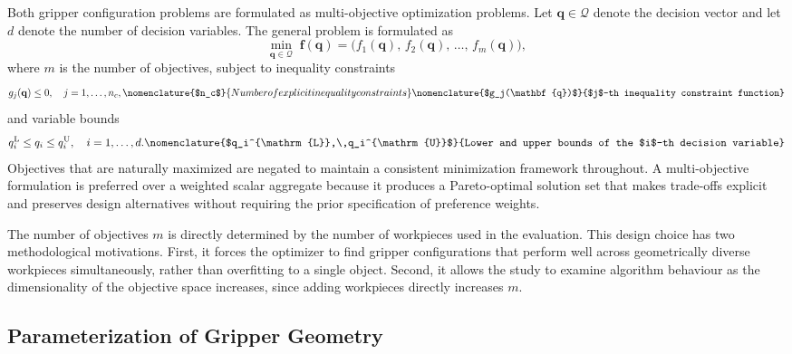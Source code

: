 Both gripper configuration problems are formulated as multi-objective optimization problems. Let $\mathbf{q} \in \mathcal{Q}$
  denote the decision vector and let $d$
denote the number of decision variables. The general problem is formulated as
\begin{equation}
    \min_{\mathbf{q} \in \mathcal{Q}}\;
    \mathbf{f}(\mathbf{q})
    = \bigl(f_1(\mathbf{q}),\, f_2(\mathbf{q}),\, \dots,\, f_m(\mathbf{q})\bigr),
\end{equation}
where $m$
is the number of objectives, subject to inequality constraints
\begin{equation}
    g_j(\mathbf{q}) \leq 0, \quad j = 1, \dots, n_c,
    \nomenclature{$n_c$}{Number of explicit inequality constraints}
    \nomenclature{$g_j(\mathbf{q})$}{$j$-th inequality constraint function}
\end{equation}
and variable bounds
\begin{equation}
    q_i^{\mathrm{L}} \leq q_i \leq q_i^{\mathrm{U}}, \quad i = 1, \dots, d.
    \nomenclature{$q_i^{\mathrm{L}},\,q_i^{\mathrm{U}}$}{Lower and upper bounds
    of the $i$-th decision variable}
\end{equation}
Objectives that are naturally maximized are negated to maintain a consistent minimization framework throughout. A multi-objective formulation is
preferred over a weighted scalar aggregate because it produces a Pareto-optimal solution set that makes trade-offs explicit and preserves design
alternatives without requiring the prior specification of preference weights.

The number of objectives $m$ is directly determined by the number of workpieces used in the evaluation. This design choice has two methodological
motivations. First, it forces the optimizer to find gripper configurations that perform well across geometrically diverse workpieces simultaneously,
rather than overfitting to a single object. Second, it allows the study to examine algorithm behaviour as the dimensionality of the objective space
increases, since adding workpieces directly increases $m$.

\subsection{Parameterization of Gripper Geometry}
\label{subsec:methodology_decision_variables}

